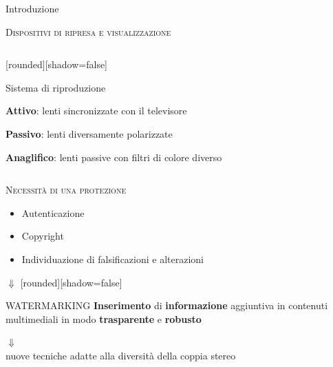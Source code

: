 \documentclass{beamer}
\begin{document}
\begin{section}{Introduzione}
\begin{frame}[t]{\textsc{Dispositivi di ripresa e visualizzazione}}
\begin{columns}
\begin{column}{5cm}
\vspace{-2.8em}
\begin{center}
[rounded][shadow=false]
\begin{block}{Sistema di riproduzione}
		\begin{itemize}
			\item  \small{\textbf{Attivo}: lenti sincronizzate con il televisore
			\item \textbf{Passivo}: lenti diversamente polarizzate
			\item \textbf{Anaglifico}: lenti passive con filtri di colore diverso}
		\end{itemize}	
	\end{block}
\end{center}
\end{column}
\end{columns}
\end{frame}



\begin{frame}[t]{\textsc{Necessit\`{a} di una protezione}}
\vspace{1em}
\begin{itemize}
\item Autenticazione
\item Copyright 
\item Individuazione di falsificazioni e alterazioni

\end{itemize}
 \hspace{50 mm}$\mathbb{\Downarrow}$
[rounded][shadow=false]
 
\begin{block}{\centering WATERMARKING}
\center \small{\textbf{Inserimento} di \textbf{informazione} aggiuntiva in contenuti multimediali in modo \textbf{trasparente} e \textbf{robusto}\\
}
\end{block}
 \hspace{50 mm} $\mathbb{\Downarrow}$\\
\centering nuove tecniche adatte alla diversit\`{a} della coppia stereo



\end{frame}
\end{section}
\end{document}
